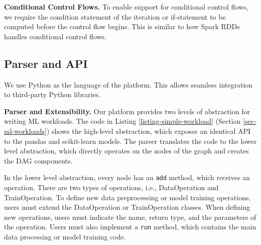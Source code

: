 \textbf{Conditional Control Flows.}
To enable support for conditional control flows, we require the condition statement of the iteration or if-statement to be computed before the control flow begins.
This is similar to how Spark RDDs \cite{zaharia2010spark} handles conditional control flows.

\subsection{Parser and API}\label{subsec-parser-api}
We use Python as the language of the platform.
This allows seamless integration to third-party Python libraries.

\textbf{Parser and Extensibility.}
Our platform provides two levels of abstraction for writing ML workloads.
The code in Listing \ref{listing-simple-workload} (Section \ref{sec-ml-workloads}) shows the high-level abstraction, which exposes an identical API to the pandas and scikit-learn models.
The parser translates the code to the lower level abstraction, which directly operates on the nodes of the graph and creates the DAG components.

In the lower level abstraction, every node has an \texttt{add} method, which receives an operation.
There are two types of operations, i.e., DataOperation and TrainOperation.
To define new data preprocessing or model training operations, users must extend the DataOperation or TrainOperation classes.
When defining new operations, users must indicate the name, return type, and the parameters of the operation. 
Users must also implement a \texttt{run} method, which contains the main data processing or model training code.


    
